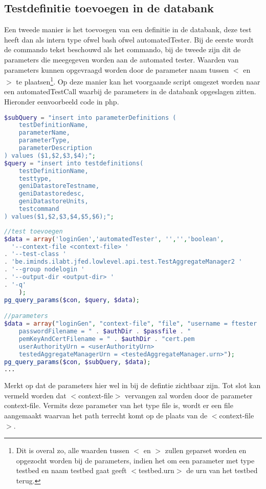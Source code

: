 \subsection{Testdefinitie toevoegen in de databank}
\npar
Een tweede manier is het toevoegen van een definitie in de databank, deze test heeft dan als intern type ofwel bash ofwel automatedTester. Bij de eerste wordt de commando tekst beschouwd als het commando, bij de tweede zijn dit de parameters die meegegeven worden aan de automated tester. Waarden van parameters kunnen opgevraagd worden door de parameter naam tussen $<$ en $>$ te plaatsen\footnote{Dit is overal zo, alle waarden tussen $<$ en $>$ zullen geparset worden en opgezocht worden bij de parameters, indien het om een parameter met type testbed en naam testbed gaat geeft $<$testbed.urn$>$ de urn van het testbed terug.}.
\npar 
Op deze manier kan het voorgaande script omgezet worden naar een automatedTestCall waarbij de parameters in de databank opgeslagen zitten. Hieronder eenvoorbeeld code in php.
\begin{lstlisting}[language=PHP]
$subQuery = "insert into parameterDefinitions (
	testDefinitionName,
	parameterName,
	parameterType,
	parameterDescription
) values ($1,$2,$3,$4);";
$query = "insert into testdefinitions(
	testDefinitionName,
	testtype,
	geniDatastoreTestname,
	geniDatastoredesc,
	geniDatastoreUnits,
	testcommand
) values($1,$2,$3,$4,$5,$6);";
\end{lstlisting}
\clearpage
\begin{lstlisting}[language=PHP]
//test toevoegen
$data = array('loginGen','automatedTester', '','','boolean', 
  '--context-file <context-file> '
. '--test-class '
. 'be.iminds.ilabt.jfed.lowlevel.api.test.TestAggregateManager2 '
. '--group nodelogin '
. '--output-dir <output-dir> '
. '-q'
    ); 
pg_query_params($con, $query, $data);

//parameters
$data = array("loginGen", "context-file", "file", "username = ftester
    passwordFilename = " . $authDir . $passfile . "
    pemKeyAndCertFilename = " . $authDir . "cert.pem
    userAuthorityUrn = <userAuthorityUrn>
    testedAggregateManagerUrn = <testedAggregateManager.urn>");
pg_query_params($con, $subQuery, $data);
...
\end{lstlisting}
\npar
Merkt op dat de parameters hier wel in bij de defintie zichtbaar zijn. Tot slot kan vermeld worden dat $<$context-file$>$ vervangen zal worden door de parameter context-file. Vermits deze parameter van het type file is, wordt er een file aangemaakt waarvan het path terrecht komt op de plaats van de $<$context-file$>$. 

